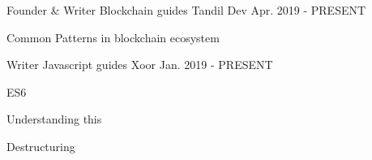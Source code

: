 


\begin{cventries}


\cventry
{Founder \& Writer} %
{Blockchain guides} %
{Tandil Dev} %
{Apr. 2019 - PRESENT} %
{ %
\begin{cvitems}
\item {Common Patterns in blockchain ecosystem}
\end{cvitems}
}


\cventry
{Writer} %
{Javascript guides} %
{Xoor} %
{Jan. 2019 - PRESENT} %
{ %
\begin{cvitems}
\item {ES6}
\item {Understanding this}
\item {Destructuring}
\end{cvitems}
}

\end{cventries}
